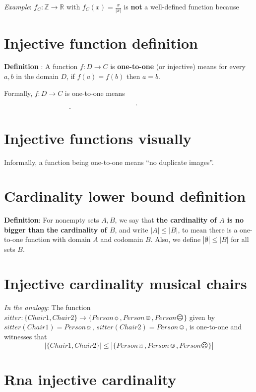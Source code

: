 \documentclass[12pt, oneside]{article}
\begin{document}
{\it Example}: $f_C: \mathbb{Z} \to \mathbb{R}$ with $f_C(x) = \frac{x}{|x|}$ is {\bf not} a well-defined function because

\vspace{100pt}
 \vfill
\section*{Injective function definition}


{\bf Definition} : A function $f: D  \to C$ is {\bf one-to-one} (or  injective) 
means for every $a,b$ in the domain $D$, 
if $f(a) = f(b)$ then  $a=b$.

Formally, $f: D  \to  C$ is  one-to-one  means $\underline{\phantom{\forall a \in D \forall b \in D ~(f(a) = f(b) \to a = b)}}$.
 \vfill
\section*{Injective functions visually}


Informally, a function being one-to-one means ``no duplicate images''.

\phantom{Draw finite domain, finite codomain picture with duplicate image.}
\vspace{50pt} \vfill
\section*{Cardinality lower bound definition}


{\bf Definition}:  For nonempty sets $A, B$, we say that {\bf the  cardinality of $A$ is  no  bigger than the cardinality of $B$}, 
and write $|A| \leq |B|$, to mean there is a  one-to-one function  with domain $A$  and codomain $B$.
Also, we define $|\emptyset| \leq |B|$ for all sets $B$. \vfill
\section*{Injective cardinality musical chairs}


{\it In the analogy}: The function $sitter: \{ Chair1, Chair2\} \to \{ Person\sun, Person\smiley, Person\frownie \}$ given
by $sitter(Chair1) = Person\sun$,  $sitter(Chair2) = Person\smiley$, is one-to-one and witnesses that 
\[
| \{ Chair1, Chair2\} | \leq |\{ Person\sun, Person\smiley, Person\frownie \}|
\] \vfill
\section*{Rna injective cardinality}
\end{document}
